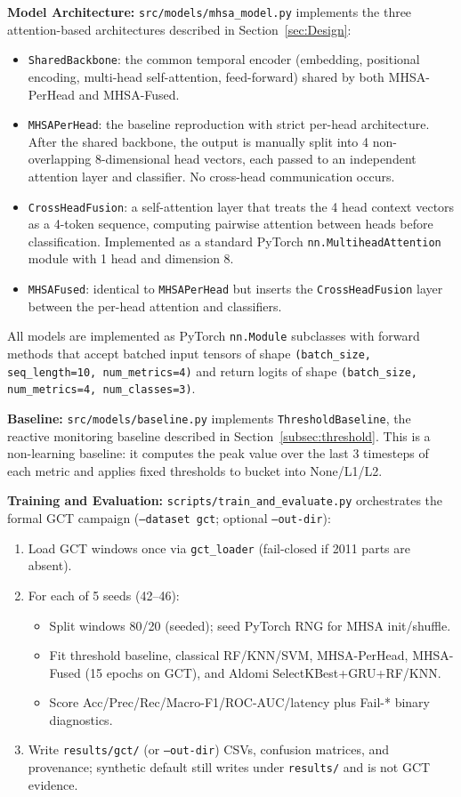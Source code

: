 \textbf{Model Architecture:} \texttt{src/models/mhsa\_model.py} implements the three attention-based architectures described in Section~\ref{sec:Design}:
\begin{itemize}
  \item \texttt{SharedBackbone}: the common temporal encoder (embedding, positional encoding, multi-head self-attention, feed-forward) shared by both MHSA-PerHead and MHSA-Fused.
  \item \texttt{MHSAPerHead}: the baseline reproduction with strict per-head architecture. After the shared backbone, the output is manually split into 4 non-overlapping 8-dimensional head vectors, each passed to an independent attention layer and classifier. No cross-head communication occurs.
  \item \texttt{CrossHeadFusion}: a self-attention layer that treats the 4 head context vectors as a 4-token sequence, computing pairwise attention between heads before classification. Implemented as a standard PyTorch \texttt{nn.MultiheadAttention} module with 1 head and dimension 8.
  \item \texttt{MHSAFused}: identical to \texttt{MHSAPerHead} but inserts the \texttt{CrossHeadFusion} layer between the per-head attention and classifiers.
\end{itemize}

All models are implemented as PyTorch \texttt{nn.Module} subclasses with forward methods that accept batched input tensors of shape \texttt{(batch\_size, seq\_length=10, num\_metrics=4)} and return logits of shape \texttt{(batch\_size, num\_metrics=4, num\_classes=3)}.

\textbf{Baseline:} \texttt{src/models/baseline.py} implements \texttt{ThresholdBaseline}, the reactive monitoring baseline described in Section~\ref{subsec:threshold}. This is a non-learning baseline: it computes the peak value over the last 3 timesteps of each metric and applies fixed thresholds to bucket into None/L1/L2.

\textbf{Training and Evaluation:} \texttt{scripts/train\_and\_evaluate.py} orchestrates the formal GCT campaign (\texttt{--dataset gct}; optional \texttt{--out-dir}):
\begin{enumerate}
  \item Load GCT windows once via \texttt{gct\_loader} (fail-closed if 2011 parts are absent).
  \item For each of 5 seeds (42--46):
  \begin{itemize}
    \item Split windows 80/20 (seeded); seed PyTorch RNG for MHSA init/shuffle.
    \item Fit threshold baseline, classical RF/KNN/SVM, MHSA-PerHead, MHSA-Fused (15 epochs on GCT), and Aldomi SelectKBest+GRU+RF/KNN.
    \item Score Acc/Prec/Rec/Macro-F1/ROC-AUC/latency plus Fail-* binary diagnostics.
  \end{itemize}
  \item Write \texttt{results/gct/} (or \texttt{--out-dir}) CSVs, confusion matrices, and provenance; synthetic default still writes under \texttt{results/} and is not GCT evidence.
\end{enumerate}

